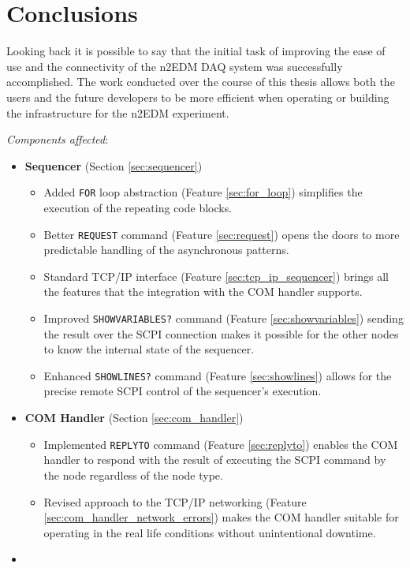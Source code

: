 \chapter{Conclusions}

Looking back it is possible to say that the initial task of improving the ease of use and the connectivity of the n2EDM DAQ system was successfully accomplished. The work conducted over the course of this thesis allows both the users and the future developers to be more efficient when operating or building the infrastructure for the n2EDM experiment.

\textit{Components affected}:
\begin{itemize}
	\item{
		\textbf{Sequencer} (Section \ref{sec:sequencer})
		\begin{itemize}
			\item Added \texttt{FOR} loop abstraction (Feature \ref{sec:for_loop}) simplifies the execution of the repeating code blocks.
			\item Better \texttt{REQUEST} command (Feature \ref{sec:request}) opens the doors to more predictable handling of the asynchronous patterns.
			\item Standard TCP/IP interface (Feature \ref{sec:tcp_ip_sequencer}) brings all the features that the integration with the COM handler supports.
			\item Improved \texttt{SHOWVARIABLES?} command (Feature \ref{sec:showvariables}) sending the result over the SCPI connection makes it possible for the other nodes to know the internal state of the sequencer.
			\item Enhanced \texttt{SHOWLINES?} command (Feature \ref{sec:showlines}) allows for the precise remote SCPI control of the sequencer's execution.
		\end{itemize}
	}
	\item{
		\textbf{COM Handler} (Section \ref{sec:com_handler})
		\begin{itemize}
			\item Implemented \texttt{REPLYTO} command (Feature \ref{sec:replyto}) enables the COM handler to respond with the result of executing the SCPI command by the node regardless of the node type.
			\item Revised approach to the TCP/IP networking (Feature \ref{sec:com_handler_network_errors}) makes the COM handler suitable for operating in the real life conditions without unintentional downtime.
		\end{itemize}
	}
	\item{
}
\end{itemize}
